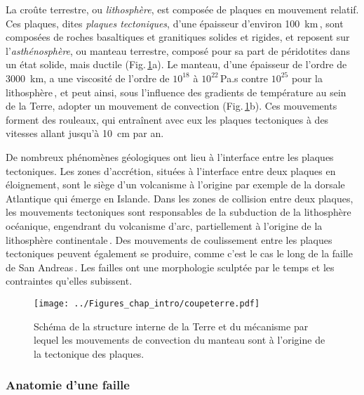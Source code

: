 La croûte terrestre, ou \textit{lithosphère}, est composée de plaques en mouvement relatif. Ces plaques, dites \textit{plaques tectoniques}, d'une épaisseur d'environ \SI{100}{\kilo\meter}\,\cite{pollack_regional_1977}, sont composées de roches basaltiques et granitiques solides et rigides, et reposent sur l'\textit{asthénosphère}, ou manteau terrestre, composé pour sa part de péridotites dans un état solide, mais ductile (Fig.\,\ref{fig:tecto}a). Le manteau, d'une épaisseur de l'ordre de \SI{3000}{\kilo\meter}, a une viscosité de l'ordre de $10^{18}$ à $10^{22}$\,Pa.s  contre $10^{25}$ pour la lithosphère\,\cite{cathles_viscosity_2015}, et peut ainsi, sous l'influence des gradients de température au sein de la Terre, adopter un mouvement de convection (Fig.\,\ref{fig:tecto}b). Ces mouvements forment des rouleaux, qui entraînent avec eux les plaques tectoniques à des vitesses allant jusqu'à \SI{10}{\centi\meter} par an.

De nombreux phénomènes géologiques ont lieu à l'interface entre les plaques tectoniques. Les zones d’accrétion, situées à l'interface entre deux plaques en éloignement, sont le siège d'un volcanisme à l'origine par exemple de la dorsale Atlantique qui émerge en Islande. Dans les zones de collision entre deux plaques, les mouvements tectoniques sont responsables de la subduction de la lithosphère océanique, engendrant du volcanisme d'arc, partiellement à l'origine de la lithosphère continentale\,\cite{stern_subduction_2002,Hawkesworth_generation_2010}. Des mouvements de coulissement entre les plaques tectoniques peuvent également se produire, comme c'est le cas le long de la faille de San Andreas\,\cite{anderson_san_1971, okubo_fractal_1987,zoback_new_1987, powell_evolution_1992, linde_slow_1996, tan_connecting_2020}. Les failles ont une morphologie sculptée par le temps et les contraintes qu'elles subissent.

\begin{figure}[hbt]
\centering
\texttt{[image: ../Figures\_chap\_intro/coupeterre.pdf]}
\caption[Structure interne de la Terre]{Schéma de la structure interne de la Terre et du mécanisme par lequel les mouvements de convection du manteau sont à l'origine de la tectonique des plaques.}
\label{fig:tecto}
\end{figure}


\subsubsection{Anatomie d'une faille}



